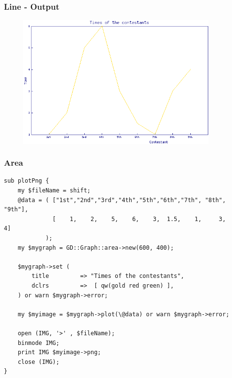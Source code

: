 \documentclass{beamer}
\begin{document}
\begin{frame} \frametitle{Line - Output}
\begin{figure}[htbp]
\begin{center}
\includegraphics[width=0.9\textwidth]{image/lines.png}
\end{center}
\end{figure}
\end{frame}

\begin{frame}[fragile] \frametitle{Area}
\begin{lstlisting}[language=perl_u,breaklines=true]
sub plotPng {    
    my $fileName = shift;
    @data = ( ["1st","2nd","3rd","4th","5th","6th","7th", "8th", "9th"],
              [    1,    2,    5,    6,    3,  1.5,    1,     3,     4]
            );
    my $mygraph = GD::Graph::area->new(600, 400);
    
    $mygraph->set (
        title         => "Times of the contestants",
        dclrs         =>  [ qw(gold red green) ],
    ) or warn $mygraph->error;

    my $myimage = $mygraph->plot(\@data) or warn $mygraph->error;
    
    open (IMG, '>' , $fileName);
    binmode IMG;
    print IMG $myimage->png;
    close (IMG);
}
\end{lstlisting}
\end{frame}
\end{document}
